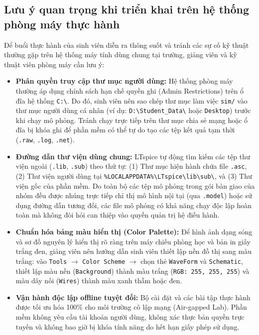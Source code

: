 \documentclass[12pt,a4paper]{article}
\begin{document}
\subsection{Lưu ý quan trọng khi triển khai trên hệ thống phòng máy thực hành}
Để buổi thực hành của sinh viên diễn ra thông suốt và tránh các sự cố kỹ thuật thường gặp trên hệ thống máy tính dùng chung tại trường, giảng viên và kỹ thuật viên phòng máy cần lưu ý:
\begin{itemize}[itemsep=2pt]
  \item \textbf{Phân quyền truy cập thư mục người dùng:} Hệ thống phòng máy thường áp dụng chính sách hạn chế quyền ghi (Admin Restrictions) trên ổ đĩa hệ thống \texttt{C:\textbackslash}. Do đó, sinh viên nên sao chép thư mục làm việc \texttt{sim/} vào thư mục người dùng cá nhân (ví dụ: \texttt{D:\textbackslash Student\_Data\textbackslash} hoặc \texttt{Desktop}) trước khi chạy mô phỏng. Tránh chạy trực tiếp trên thư mục chia sẻ mạng hoặc ổ đĩa bị khóa ghi để phần mềm có thể tự do tạo các tệp kết quả tạm thời (\texttt{.raw}, \texttt{.log}, \texttt{.net}).
  \item \textbf{Đường dẫn thư viện dùng chung:} LTspice tự động tìm kiếm các tệp thư viện ngoài (\texttt{.lib}, \texttt{.sub}) theo thứ tự: (1) Thư mục hiện hành chứa file \texttt{.asc}, (2) Thư viện người dùng tại \texttt{\%LOCALAPPDATA\%\textbackslash LTspice\textbackslash lib\textbackslash sub\textbackslash}, và (3) Thư viện gốc của phần mềm. Do toàn bộ các tệp mô phỏng trong gói bàn giao của nhóm đều được nhúng trực tiếp chỉ thị mô hình nội tại (qua \texttt{.model}) hoặc sử dụng đường dẫn tương đối, các file mô phỏng có khả năng chạy độc lập hoàn toàn mà không đòi hỏi can thiệp vào quyền quản trị hệ điều hành.
  \item \textbf{Chuẩn hóa bảng màu hiển thị (Color Palette):} Để hình ảnh dạng sóng và sơ đồ nguyên lý hiển thị rõ ràng trên máy chiếu phòng học và bản in giấy trắng đen, giảng viên nên hướng dẫn sinh viên thiết lập nền đồ thị sang màu trắng: vào \texttt{Tools} $\rightarrow$ \texttt{Color Scheme} $\rightarrow$ chọn thẻ \texttt{WaveForm} và \texttt{Schematic}, thiết lập màu nền (\texttt{Background}) thành màu trắng (\texttt{RGB: 255, 255, 255}) và màu dây nối (\texttt{Wires}) thành màu xanh thẫm hoặc đen.
  \item \textbf{Vận hành độc lập offline tuyệt đối:} Bộ cài đặt và các bài tập thực hành được tối ưu hóa 100\% cho môi trường cô lập mạng (Air-gapped Lab). Phần mềm không yêu cầu tài khoản người dùng, không xác thực bản quyền trực tuyến và không bao giờ bị khóa tính năng do hết hạn giấy phép sử dụng.
\end{itemize}
\end{document}
